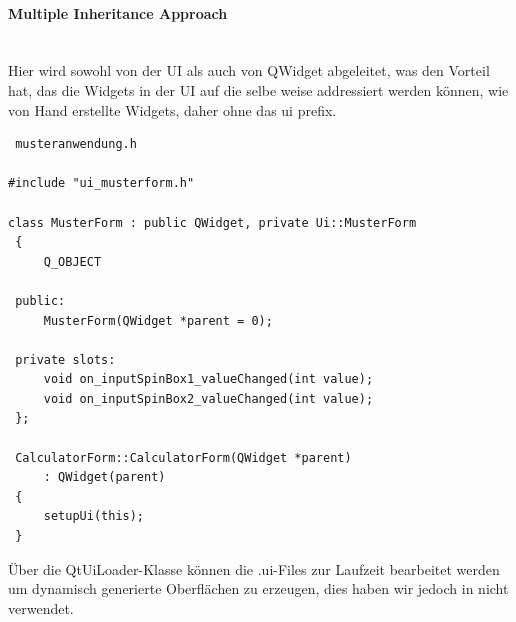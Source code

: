\paragraph{Multiple Inheritance Approach}\mbox{}\\
Hier wird sowohl von der UI als auch von QWidget abgeleitet, was den Vorteil hat, das die Widgets in der UI auf die selbe weise addressiert werden können, wie von Hand erstellte Widgets, daher ohne das ui prefix.
\begin{lstlisting}
 musteranwendung.h

#include "ui_musterform.h"

class MusterForm : public QWidget, private Ui::MusterForm
 {
     Q_OBJECT

 public:
     MusterForm(QWidget *parent = 0);

 private slots:
     void on_inputSpinBox1_valueChanged(int value);
     void on_inputSpinBox2_valueChanged(int value);
 };

 CalculatorForm::CalculatorForm(QWidget *parent)
     : QWidget(parent)
 {
     setupUi(this);
 }
\end{lstlisting}
Über die QtUiLoader-Klasse können die .ui-Files zur Laufzeit bearbeitet werden um dynamisch generierte Oberflächen zu erzeugen, dies haben wir jedoch in \EBP nicht verwendet.\\
\cite{QT_UIC} 
\newpage
